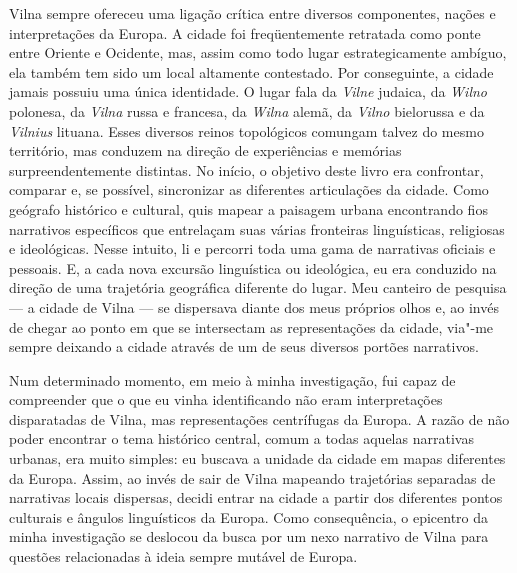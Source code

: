 Vilna sempre ofereceu uma ligação crítica entre diversos componentes,
nações e interpretações da Europa. A cidade foi freqüentemente retratada
como ponte entre Oriente e Ocidente, mas, assim como todo lugar
estrategicamente ambíguo, ela também tem sido um local altamente
contestado. Por conseguinte, a cidade jamais possuiu uma única
identidade. O lugar fala da \textit{Vilne} judaica, da \textit{Wilno}
polonesa, da \textit{Vilna} russa e francesa, da \textit{Wilna} alemã, da
\textit{Vilno} bielorussa e da \textit{Vilnius} lituana. Esses diversos
reinos topológicos comungam talvez do mesmo território, mas conduzem na
direção de experiências e memórias surpreendentemente distintas. No
início, o objetivo deste livro era confrontar, comparar e, se possível,
sincronizar as diferentes articulações da cidade. Como geógrafo
histórico e cultural, quis mapear a paisagem urbana encontrando fios
narrativos específicos que entrelaçam suas várias fronteiras
linguísticas, religiosas e ideológicas. Nesse intuito, li e percorri
toda uma gama de narrativas oficiais e pessoais. E, a cada nova excursão
linguística ou ideológica, eu era conduzido na direção de uma trajetória
geográfica diferente do lugar. Meu canteiro de pesquisa --- a cidade de
Vilna --- se dispersava diante dos meus próprios olhos e, ao invés de
chegar ao ponto em que se intersectam as representações da cidade,
via"-me sempre deixando a cidade através de um de seus diversos portões
narrativos.

Num determinado momento, em meio à minha investigação, fui capaz de
compreender que o que eu vinha identificando não eram interpretações
disparatadas de Vilna, mas representações centrífugas da Europa. A razão
de não poder encontrar o tema histórico central, comum a todas aquelas
narrativas urbanas, era muito simples: eu buscava a unidade da cidade em
mapas diferentes da Europa. Assim, ao invés de sair de Vilna mapeando
trajetórias separadas de narrativas locais dispersas, decidi entrar na
cidade a partir dos diferentes pontos culturais e ângulos linguísticos
da Europa. Como consequência, o epicentro da minha investigação se
deslocou da busca por um nexo narrativo de Vilna para questões
relacionadas à ideia sempre mutável de Europa.

%


